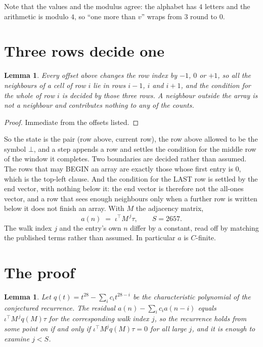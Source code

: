 \documentclass[11pt,a4paper]{article}
\theoremstyle{plain}
\newtheorem{lemma}[theorem]{Lemma}
\theoremstyle{definition}
\begin{document}
Note that the values and the modulus agree: the alphabet has $4$ letters and the arithmetic
is modulo $4$, so ``one more than $v$'' wraps from $3$ round to $0$.

\section{Three rows decide one}

\begin{lemma}\label{lem:win}
Every offset above changes the row index by $-1$, $0$ or $+1$, so all the neighbours of a cell
of row $i$ lie in rows $i-1$, $i$ and $i+1$, and the condition for the whole of row $i$ is
decided by those three rows. A neighbour outside the array is not a neighbour and contributes
nothing to any of the counts.
\end{lemma}

\begin{proof}
Immediate from the offsets listed.
\end{proof}

So the state is the pair (row above, current row), the row above allowed to be the symbol
$\bot$, and a step appends a row and settles the condition for the middle row of the window it
completes. Two boundaries are decided rather than assumed. The rows that may BEGIN an array are
exactly those whose first entry is $0$, which is the top-left clause. And the condition for the
LAST row is settled by the end vector, with nothing below it: the end vector is therefore not
the all-ones vector, and a row that sees enough neighbours only when a further row is written
below it does not finish an array. With $M$ the adjacency matrix,
\[
a(n)\;=\;\iota^{\!\top}M^{\,j}\tau ,\qquad S=2657.
\]
The walk index $j$ and the entry's own $n$ differ by a constant, read off by matching the
published terms rather than assumed. In particular $a$ is $C$-finite.

\section{The proof}

\begin{lemma}\label{lem:crit}
Let $q(t)=t^{28}-\sum_i c_it^{28-i}$ be the characteristic polynomial of the
conjectured recurrence. The residual $a(n)-\sum_ic_ia(n-i)$ equals
$\iota^{\!\top}M^{\,j}q(M)\tau$ for the corresponding walk index $j$, so the recurrence
holds from some point on if and only if $\iota^{\!\top}M^{j}q(M)\tau=0$ for all large $j$,
and it is enough to examine $j<S$.
\end{lemma}
\end{document}
